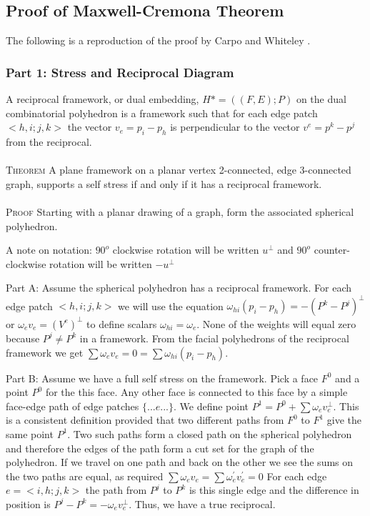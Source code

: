 \documentclass[11pt]{article}
\theoremstyle{definition}
\begin{document}
\subsection{Proof of Maxwell-Cremona Theorem}
The following is a reproduction of the proof by Carpo and Whiteley \cite{mccProof}.
\subsubsection{Part 1: Stress and Reciprocal Diagram}
A reciprocal framework, or dual embedding, $H* = ((F,E);P)$ on the dual combinatorial polyhedron is a framework such that for each edge patch $<h,i;j,k>$  the vector $v_e = p_i - p_h$ is perpendicular to the vector $v^e = p^k - p^j$ from the reciprocal. \\
\\
\textsc{Theorem} A plane framework on a planar vertex 2-connected, edge 3-connected graph, supports a self stress if and only if it has a reciprocal framework. \\
\\
\textsc{Proof} Starting with a planar drawing of a graph, form the associated spherical polyhedron. 

A note on notation: $90^o$ clockwise rotation will be written $u^\bot$ and $90^o$ counter-clockwise rotation will be written $-u^\bot$

Part A: Assume the spherical polyhedron has a reciprocal framework.
For each edge patch $<h,i;j,k>$ we will use the equation $\omega_{hi}(p_i - p_h) = -(P^k - P^j)^\bot$ or $\omega_ev_e = (V^e)^\bot$ to define scalars $\omega_{hi} = \omega_e$. None of the weights will equal zero because $P^j \neq P^k$ in a framework. From the facial polyhedrons of the reciprocal framework we get $\sum\omega_ev_e = 0 = \sum\omega_{hi}(p_i - p_h)$.

Part B: Assume we have a full self stress on the framework.
Pick a face $F^0$ and a point $P^0$ for the this face. Any other face is connected to this face by a simple face-edge path of edge patches $\{...e...\}$. We define point $P^1 = P^0 + \sum\omega_ev_e^\bot$. This is a consistent definition provided that two different paths from $F^0$ to $F^1$ give the same point $P^1$. Two such paths form a closed path on the spherical polyhedron and therefore the edges of the path form a cut set for the graph of the polyhedron. If we travel on one path and back on the other we see the sums on the two paths are equal, as required $\sum\omega_ev_e = \sum\omega_e^{'}v_e^{'} = 0$ For each edge $e = <i,h;j,k>$ the path from $P^j$ to $P^k$ is this single edge and the difference in position is $P^j - P^k = -\omega_ev_e^\bot$. Thus, we have a true reciprocal.
\end{document}
